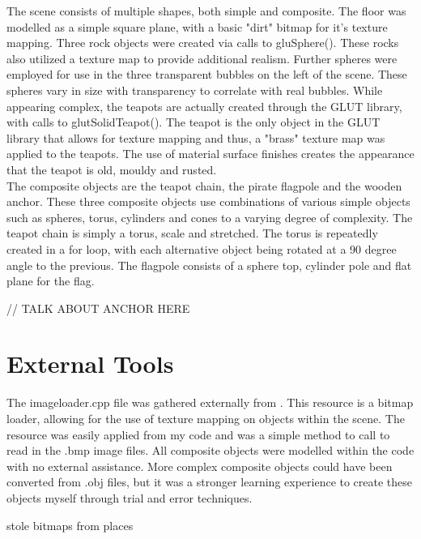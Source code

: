 \documentclass[]{article}
\begin{document}
The scene consists of multiple shapes, both simple and composite. The floor was modelled as a simple square plane, with a basic "dirt" bitmap for it's texture mapping. Three rock objects were created via calls to gluSphere(). These rocks also utilized a texture map to provide additional realism. Further spheres were employed for use in the three transparent bubbles on the left of the scene. These spheres vary in size with transparency to correlate with real bubbles. While appearing complex, the teapots are actually created through the GLUT library, with calls to glutSolidTeapot(). The teapot is the only object in the GLUT library that allows for texture mapping and thus, a "brass" texture map was applied to the teapots. The use of material surface finishes creates the appearance that the teapot is old, mouldy and rusted. \\

The composite objects are the teapot chain, the pirate flagpole and the wooden anchor. These three composite objects use combinations of various simple objects such as spheres, torus, cylinders and cones to a varying degree of complexity. The teapot chain is simply a torus, scale and stretched. The torus is repeatedly created in a for loop, with each alternative object being rotated at a 90 degree angle to the previous. The flagpole consists of a sphere top, cylinder pole and flat plane for the flag.

// TALK ABOUT ANCHOR HERE

\section*{External Tools}

The imageloader.cpp file was gathered externally from \cite{VidRock}. This resource is a bitmap loader, allowing for the use of texture mapping on objects within the scene. The resource was easily applied from my code and was a simple method to call to read in the .bmp image files. All composite objects were modelled within the code with no external assistance. More complex composite objects could have been converted from .obj files, but it was a stronger learning experience to create these objects myself through trial and error techniques.

stole bitmaps from places

\end{document}
